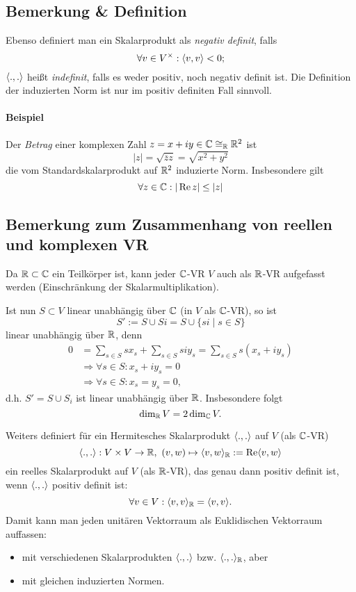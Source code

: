 \subsection{Bemerkung \& Definition}
\begin{Definition}
	Ebenso definiert man ein Skalarprodukt als \emph{negativ definit}, falls
		\[ \forall v\in V^\times: \langle  v,v \rangle < 0; \]
	$ \langle .,. \rangle $ heißt \emph{indefinit}, falls es weder positiv, noch negativ definit ist.
	Die Definition der induzierten Norm ist nur im positiv definiten Fall sinnvoll.
\end{Definition}


\paragraph{Beispiel}	
	Der \emph{Betrag} einer komplexen Zahl
		$ z=x+iy\in \mathbb{C}\cong_{\mathbb{R}} \mathbb{R}^2 $
	ist 
		\[ |z| = \sqrt{\overline{z}z} = \sqrt{x^2+y^2} \]
	die vom Standardskalarprodukt auf $ \mathbb{R}^2 $ induzierte Norm.
	Insbesondere gilt
		\[ \forall z\in \mathbb{C}: |\operatorname{Re} z| \leq |z| \]	
\subsection{Bemerkung zum Zusammenhang von reellen und komplexen VR}
	Da $ \mathbb{R}\subset \mathbb{C} $ ein Teilkörper ist, kann jeder $ \mathbb{C} $-VR $ V $ auch als $ \mathbb{R} $-VR aufgefasst werden (Einschränkung der Skalarmultiplikation).
	
	Ist nun $ S\subset V $ linear unabhängig über $ \mathbb{C} $ (in $ V $ als $ \mathbb{C} $-VR), so ist
		\[ S' := S\cup Si = S \cup \{si\mid s\in S\} \]
	linear unabhängig über $ \mathbb{R} $, denn
		\begin{align*}
			0 &= \sum_{s\in S}sx_s + \sum_{s\in S}siy_s = \sum_{s\in S} s (x_s+iy_s)\\
			&\Rightarrow \forall s\in S: x_s + iy_s = 0\\
			&\Rightarrow \forall s\in S: x_s = y_s = 0,
		\end{align*}
	d.h. $ S' = S\cup S_i $ ist linear unabhängig über $ \mathbb{R} $.
	Insbesondere folgt
		\[ \dim_{\mathbb{R}} V = 2\dim_{\mathbb{C}} V.  \]

	Weiters definiert für ein Hermitesches Skalarprodukt $ \langle  .,.  \rangle $ auf $ V $ (als $ \mathbb{C} $-VR)
		\[ \langle  .,.  \rangle :V\times V\to \mathbb{R},\ (v,w)\mapsto \langle  v,w  \rangle_{\mathbb{R}} := \operatorname{Re} \langle v,w  \rangle \]
	ein reelles Skalarprodukt auf $ V $ (als $ \mathbb{R} $-VR), das genau dann positiv definit ist, wenn $ \langle .,.  \rangle $ positiv definit ist:
		\[ \forall v\in V: \langle v,v  \rangle_{\mathbb{R}} = \langle v,v  \rangle. \]
	Damit kann man jeden unitären Vektorraum als Euklidischen Vektorraum auffassen:
		\begin{itemize}
			\item mit verschiedenen Skalarprodukten $ \langle .,. \rangle $ bzw. $ \langle .,. \rangle_{\mathbb{R}} $, aber
			\item mit gleichen induzierten Normen. %
		\end{itemize}
